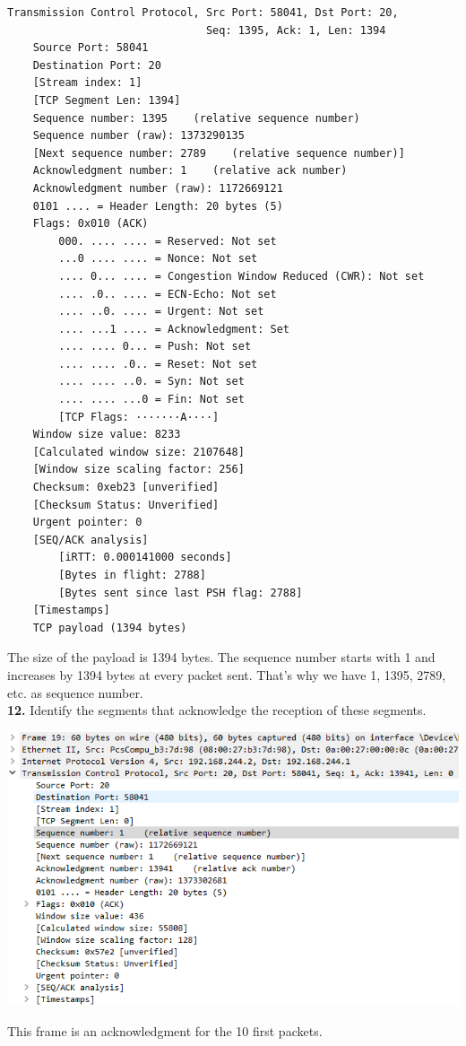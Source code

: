 \documentclass[12pt]{extarticle}
\begin{document}
\begin{verbatim}
Transmission Control Protocol, Src Port: 58041, Dst Port: 20,
                               Seq: 1395, Ack: 1, Len: 1394
    Source Port: 58041
    Destination Port: 20
    [Stream index: 1]
    [TCP Segment Len: 1394]
    Sequence number: 1395    (relative sequence number)
    Sequence number (raw): 1373290135
    [Next sequence number: 2789    (relative sequence number)]
    Acknowledgment number: 1    (relative ack number)
    Acknowledgment number (raw): 1172669121
    0101 .... = Header Length: 20 bytes (5)
    Flags: 0x010 (ACK)
        000. .... .... = Reserved: Not set
        ...0 .... .... = Nonce: Not set
        .... 0... .... = Congestion Window Reduced (CWR): Not set
        .... .0.. .... = ECN-Echo: Not set
        .... ..0. .... = Urgent: Not set
        .... ...1 .... = Acknowledgment: Set
        .... .... 0... = Push: Not set
        .... .... .0.. = Reset: Not set
        .... .... ..0. = Syn: Not set
        .... .... ...0 = Fin: Not set
        [TCP Flags: ·······A····]
    Window size value: 8233
    [Calculated window size: 2107648]
    [Window size scaling factor: 256]
    Checksum: 0xeb23 [unverified]
    [Checksum Status: Unverified]
    Urgent pointer: 0
    [SEQ/ACK analysis]
        [iRTT: 0.000141000 seconds]
        [Bytes in flight: 2788]
        [Bytes sent since last PSH flag: 2788]
    [Timestamps]
    TCP payload (1394 bytes)
\end{verbatim}
The size of the payload is 1394 bytes. The sequence number starts with 1 and increases by 1394 bytes at every packet sent. That's why we have 1, 1395, 2789, etc. as sequence number.\\

\textbf{12.} Identify the segments that acknowledge the reception of these segments.
\begin{center}
\includegraphics[scale=0.8]{resources/5-5-1.png}
\end{center}
This frame is an acknowledgment for the 10 first packets.\\
\end{document}

